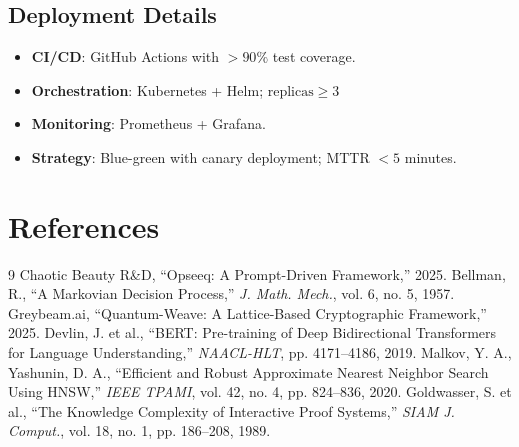 \documentclass[11pt]{article}
\begin{document}
\subsection{Deployment Details}

\begin{itemize}
    \item \textbf{CI/CD}: GitHub Actions with $>90\%$ test coverage.
    \item \textbf{Orchestration}: Kubernetes + Helm; $ \text{replicas} \geq 3 $
    \item \textbf{Monitoring}: Prometheus + Grafana.
    \item \textbf{Strategy}: Blue-green with canary deployment; MTTR $<5$ minutes.
\end{itemize}

\section{References}
\label{app:references}

\begin{thebibliography}{9}
 Chaotic Beauty R\&D, ``Opseeq: A Prompt-Driven Framework,'' 2025.
 Bellman, R., ``A Markovian Decision Process,'' \emph{J. Math. Mech.}, vol. 6, no. 5, 1957.
 Greybeam.ai, ``Quantum-Weave: A Lattice-Based Cryptographic Framework,'' 2025.
 Devlin, J. et al., ``BERT: Pre-training of Deep Bidirectional Transformers for Language Understanding,'' \emph{NAACL-HLT}, pp. 4171–4186, 2019.
 Malkov, Y. A., Yashunin, D. A., ``Efficient and Robust Approximate Nearest Neighbor Search Using HNSW,'' \emph{IEEE TPAMI}, vol. 42, no. 4, pp. 824–836, 2020.
 Goldwasser, S. et al., ``The Knowledge Complexity of Interactive Proof Systems,'' \emph{SIAM J. Comput.}, vol. 18, no. 1, pp. 186–208, 1989.
\end{thebibliography}
\end{document}
